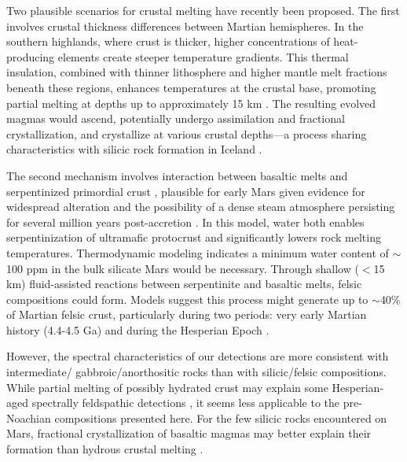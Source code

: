 \documentclass[12pt]{article}
\begin{document}
Two plausible scenarios for crustal melting have recently been proposed. The first involves crustal thickness differences between Martian hemispheres. In the southern highlands, where crust is thicker, higher concentrations of heat-producing elements create steeper temperature gradients. This thermal insulation, combined with thinner lithosphere and higher mantle melt fractions beneath these regions, enhances temperatures at the crustal base, promoting partial melting at depths up to approximately 15 km \citep{BonnetGibet2022, BonnetGibet2025}. The resulting evolved magmas would ascend, potentially undergo assimilation and fractional crystallization, and crystallize at various crustal depths---a process sharing characteristics with silicic rock formation in Iceland \citep{Jonasson2007, Martin2007, Martin2010}.

The second mechanism involves interaction between basaltic melts and serpentinized primordial crust \citep{Bernadet2025}, plausible for early Mars given evidence for widespread alteration \citep{Bibring2006, Bishop2008, Ehlmann2009, Ehlmann2014, Wordsworth2017, Viviano2023, Carter2023, Royer2024} and the possibility of a dense steam atmosphere persisting for several million years post-accretion \citep{Abe2011, Scherf2020}. In this model, water both enables serpentinization of ultramafic protocrust and significantly lowers rock melting temperatures. Thermodynamic modeling indicates a minimum water content of $\sim$100 ppm in the bulk silicate Mars would be necessary. Through shallow ($<$15 km) fluid-assisted reactions between serpentinite and basaltic melts, felsic compositions could form. Models suggest this process might generate up to $\sim$40\% of Martian felsic crust, particularly during two periods: very early Martian history (4.4-4.5 Ga) and during the Hesperian Epoch \citep{Bernadet2025}.

However, the spectral characteristics of our detections are more consistent with intermediate/ gabbroic/anorthositic rocks than with silicic/felsic compositions. While partial melting of possibly hydrated crust may explain some Hesperian-aged spectrally feldspathic detections \citep{Farrand2021, Rogers2022, Michalski2023}, it seems less applicable to the pre-Noachian compositions presented here. For the few silicic rocks encountered on Mars, fractional crystallization of basaltic magmas may better explain their formation than hydrous crustal melting \citep{Udry2018}.
\end{document}
